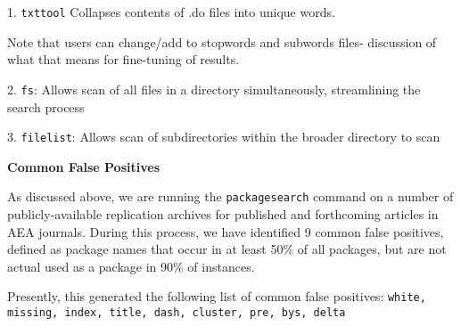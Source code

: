 1.  \texttt{txttool} Collapses contents of .do files into unique words.

Note that users can change/add to stopwords and subwords files- discussion of what that means for fine-tuning of results.

2.  \texttt{fs}: Allows scan of all files in a directory simultaneously, streamlining the search process 

3.  \texttt{filelist}: Allows scan of subdirectories within the broader directory to scan

\textbf{Common False Positives}

As discussed above, we are running the \texttt{packagesearch} command on a number of publicly-available replication archives for published and forthcoming articles in AEA journals. During this process, we have identified 9 common false positives, defined as package names that occur in at least 50\% of all packages, but are not actual used as a package in 90\% of instances.

Presently, this generated the following list of common false positives:
\texttt{white, missing, index, title, dash, cluster, pre, bys, delta}
